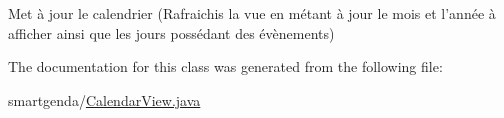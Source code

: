 Met à jour le calendrier (Rafraichis la vue en métant à jour le mois et l'année à afficher ainsi que les jours possédant des évènements) 

The documentation for this class was generated from the following file\-:\begin{DoxyCompactItemize}
\item 
smartgenda/\hyperlink{_calendar_view_8java}{Calendar\-View.\-java}\end{DoxyCompactItemize}
